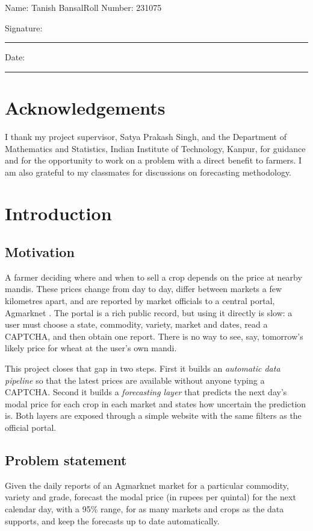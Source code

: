 \documentclass[12pt,a4paper,oneside]{report}
\newcommand{\studentname}{Tanish Bansal}
\newcommand{\rollnumber}{231075}
\newcommand{\supervisor}{Satya Prakash Singh}
\newcommand{\department}{Department of Mathematics and Statistics}
\newcommand{\institution}{Indian Institute of Technology, Kanpur}
\numberwithin{equation}{chapter}
\numberwithin{figure}{chapter}
\numberwithin{table}{chapter}
\theoremstyle{definition}
\begin{document}
\vspace{1.2cm}
\noindent Name: \studentname \hfill Roll Number: \rollnumber

\vspace{1.0cm}
\noindent Signature: \rule{7cm}{0.4pt}

\vspace{0.8cm}
\noindent Date: \rule{4cm}{0.4pt}

\clearpage
\chapter*{Acknowledgements}
I thank my project supervisor, \supervisor, and the \department, \institution, for guidance and for the opportunity to work on a problem with a direct benefit to farmers. I am also grateful to my classmates for discussions on forecasting methodology.

\clearpage
{}
\setcounter{page}{1}

\chapter{Introduction}

\section{Motivation}
A farmer deciding where and when to sell a crop depends on the price at nearby mandis. These prices change from day to day, differ between markets a few kilometres apart, and are reported by market officials to a central portal, Agmarknet \cite{agmarknet}. The portal is a rich public record, but using it directly is slow: a user must choose a state, commodity, variety, market and dates, read a CAPTCHA, and then obtain one report. There is no way to see, say, tomorrow's likely price for wheat at the user's own mandi.

This project closes that gap in two steps. First it builds an \emph{automatic data pipeline} so that the latest prices are available without anyone typing a CAPTCHA. Second it builds a \emph{forecasting layer} that predicts the next day's modal price for each crop in each market and states how uncertain the prediction is. Both layers are exposed through a simple website with the same filters as the official portal.

\section{Problem statement}
Given the daily reports of an Agmarknet market for a particular commodity, variety and grade, forecast the modal price (in rupees per quintal) for the next calendar day, with a 95\% range, for as many markets and crops as the data supports, and keep the forecasts up to date automatically.
\end{document}
